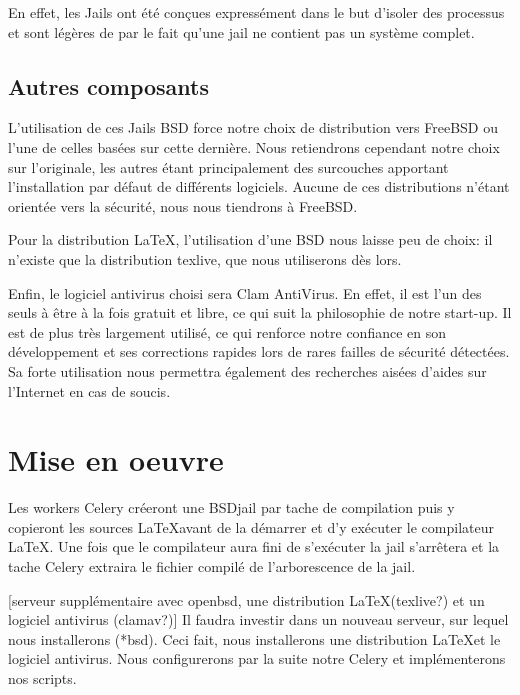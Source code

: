 \documentclass[10pt,a4paper]{article}
\begin{document}
En effet, les Jails ont été conçues expressément dans le but d'isoler des processus et sont légères de par le fait qu'une jail ne contient pas un système complet.

\subsection{Autres composants}
L'utilisation de ces Jails BSD force notre choix de distribution vers FreeBSD ou l'une de celles basées sur cette dernière. Nous retiendrons cependant notre choix sur l'originale, les autres étant principalement des surcouches apportant l'installation par défaut de différents logiciels. Aucune de ces distributions n'étant orientée vers la sécurité, nous nous tiendrons à FreeBSD.

Pour la distribution \LaTeX, l'utilisation d'une BSD nous laisse peu de choix: il n'existe que la distribution texlive, que nous utiliserons dès lors.

Enfin, le logiciel antivirus choisi sera Clam AntiVirus.
En effet, il est l'un des seuls à être à la fois gratuit et libre, ce qui suit la philosophie de notre start-up.
Il est de plus très largement utilisé, ce qui renforce notre confiance en son développement et ses corrections rapides lors de rares failles de sécurité détectées.
Sa forte utilisation nous permettra également des recherches aisées d'aides sur l'Internet en cas de soucis.

\section{Mise en oeuvre}

Les workers Celery créeront une BSDjail par tache de compilation puis y copieront les sources \LaTeX avant de la démarrer et d'y exécuter le compilateur \LaTeX.
Une fois que le compilateur aura fini de s'exécuter la jail s'arrêtera et la tache Celery extraira le fichier compilé de l'arborescence de la jail.

[serveur supplémentaire avec openbsd, une distribution \LaTeX (texlive?) et un logiciel antivirus (clamav?)]
Il faudra investir dans un nouveau serveur, sur lequel nous installerons (*bsd).
Ceci fait, nous installerons une distribution \LaTeX et le logiciel antivirus.
Nous configurerons par la suite notre Celery et implémenterons nos scripts.
\end{document}
